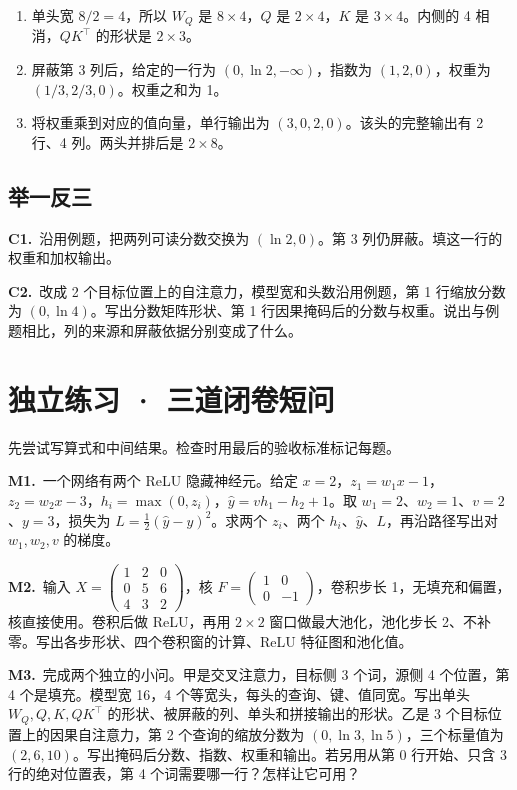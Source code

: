 \documentclass[UTF8,a4paper,11pt]{ctexart}
\newcommand{\PracticeQuestion}[3]{\par\Needspace{4\baselineskip}\noindent\begin{minipage}{\linewidth}\textbf{#1.}\ #2\par\noindent\rule{0pt}{#3mm}\par\end{minipage}\par}
\begin{document}
\begin{enumerate}
\item 单头宽 $8/2=4$，所以 $W_Q$ 是 $8\times4$，$Q$ 是 $2\times4$，$K$ 是 $3\times4$。内侧的 4 相消，$QK^\top$ 的形状是 $2\times3$。
\item 屏蔽第 3 列后，给定的一行为 $(0,\ln2,-\infty)$，指数为 $(1,2,0)$，权重为 $(1/3,2/3,0)$。权重之和为 1。
\item 将权重乘到对应的值向量，单行输出为 $(3,0,2,0)$。该头的完整输出有 2 行、4 列。两头并排后是 $2\times8$。
\end{enumerate}
\subsection{举一反三}
\PracticeQuestion{C1}{沿用例题，把两列可读分数交换为 $(\ln2,0)$。第 3 列仍屏蔽。填这一行的权重和加权输出。}{27}
\PracticeQuestion{C2}{改成 2 个目标位置上的自注意力，模型宽和头数沿用例题，第 1 行缩放分数为 $(0,\ln4)$。写出分数矩阵形状、第 1 行因果掩码后的分数与权重。说出与例题相比，列的来源和屏蔽依据分别变成了什么。}{35}
\clearpage
\section{独立练习 · 三道闭卷短问}
先尝试写算式和中间结果。检查时用最后的验收标准标记每题。

\PracticeQuestion{M1}{一个网络有两个 ReLU 隐藏神经元。给定 $x=2$，$z_1=w_1x-1$，$z_2=w_2x-3$，$h_i=\max(0,z_i)$，$\hat y=vh_1-h_2+1$。取 $w_1=2$、$w_2=1$、$v=2$、$y=3$，损失为 $L=\frac12(\hat y-y)^2$。求两个 $z_i$、两个 $h_i$、$\hat y$、$L$，再沿路径写出对 $w_1,w_2,v$ 的梯度。}{40}
\PracticeQuestion{M2}{输入 $X=\begin{pmatrix}1&2&0\\0&5&6\\4&3&2\end{pmatrix}$，核 $F=\begin{pmatrix}1&0\\0&-1\end{pmatrix}$，卷积步长 1，无填充和偏置，核直接使用。卷积后做 ReLU，再用 $2\times2$ 窗口做最大池化，池化步长 2、不补零。写出各步形状、四个卷积窗的计算、ReLU 特征图和池化值。}{43}
\PracticeQuestion{M3}{完成两个独立的小问。甲是交叉注意力，目标侧 3 个词，源侧 4 个位置，第 4 个是填充。模型宽 16，4 个等宽头，每头的查询、键、值同宽。写出单头 $W_Q,Q,K,QK^\top$ 的形状、被屏蔽的列、单头和拼接输出的形状。乙是 3 个目标位置上的因果自注意力，第 2 个查询的缩放分数为 $(0,\ln3,\ln5)$，三个标量值为 $(2,6,10)$。写出掩码后分数、指数、权重和输出。若另用从第 0 行开始、只含 3 行的绝对位置表，第 4 个词需要哪一行？怎样让它可用？}{55}
\clearpage
\end{document}
